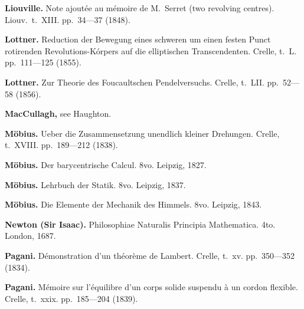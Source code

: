 \documentclass[11pt,a4paper]{book}
\begin{document}
\vspace{0.5em}

\noindent\textbf{Liouville.} Note ajout\'{e}e au m\'{e}moire de M.~Serret (two revolving centres). Liouv.~t.~XIII. pp.~34---37 (1848).

\vspace{0.5em}

\noindent\textbf{Lottner.} Reduction der Bewegung eines schweren um einen festen Punct rotirenden Revolutions-K\'{o}rpers auf die elliptischen Transcendenten. Crelle, t.~L. pp.~111---125 (1855).

\vspace{0.5em}

\noindent\textbf{Lottner.} Zur Theorie des Foucaultschen Pendelversuchs. Crelle, t.~LII. pp.~52---58 (1856).

\vspace{0.5em}

\noindent\textbf{MacCullagh,} see Haughton.

\vspace{0.5em}

\noindent\textbf{M\"{o}bius.} Ueber die Zusammensetzung unendlich kleiner Drehungen. Crelle, t.~XVIII. pp.~189---212 (1838).

\vspace{0.5em}

\noindent\textbf{M\"{o}bius.} Der barycentrische Calcul. 8vo. Leipzig, 1827.

\vspace{0.5em}

\noindent\textbf{M\"{o}bius.} Lehrbuch der Statik. 8vo. Leipzig, 1837.

\vspace{0.5em}

\noindent\textbf{M\"{o}bius.} Die Elemente der Mechanik des Himmels. 8vo. Leipzig, 1843.

\vspace{0.5em}

\noindent\textbf{Newton (Sir Isaac).} Philosophiae Naturalis Principia Mathematica. 4to. London, 1687.

\vspace{0.5em}

\noindent\textbf{Pagani.} D\'{e}monstration d'un th\'{e}or\`{e}me de Lambert. Crelle, t.~xv. pp.~350---352 (1834).

\vspace{0.5em}

\noindent\textbf{Pagani.} M\'{e}moire sur l'\'{e}quilibre d'un corps solide suspendu \`{a} un cordon flexible. Crelle, t.~xxix. pp.~185---204 (1839).
\end{document}
